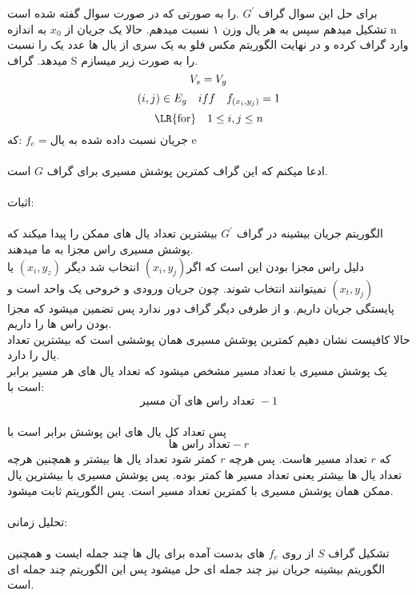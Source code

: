 \problem{}
برای حل این سوال گراف $G^{\prime}$
.را به صورتی که در صورت سوال گفته شده است تشکیل میدهم
سپس به هر یال وزن ۱ نسبت میدهم.
حالا یک جریان از $x_0$
به اندازه n
وارد گراف کرده و در نهایت الگوریتم مکس فلو به یک سری از یال ها عدد یک را نسبت
میدهد.
گراف S را به صورت زیر میسازم.\\
\[
    V_s = V_g\\
\]
\[
    (i,j) \in E_g \quad iff \quad f_{(x_i,y_j)} = 1\\
\]
\[
    \text{\LR{for}} \quad  1\leq i,j\leq n
\]
که:  $f_e = \text{جریان نسبت داده شده به یال e}$ \\\\
ادعا میکنم که این گراف کمترین پوشش مسیری برای گراف $G$ است.\\\\
اثبات:\\\\
الگوریتم جریان بیشینه در گراف $G^{\prime}$ 
بیشترین تعداد یال های ممکن را پیدا میکند که پوشش مسیری راس مجزا به ما میدهند.\\
دلیل راس مجزا بودن این است که اگر$(x_i,y_j)$ انتخاب شد
دیگر $(x_i,y_z)$ یا $(x_t,y_j)$ نمیتوانند انتخاب شوند.
چون جریان ورودی و خروحی یک واحد است و پایستگی جریان داریم.
و از طرفی دیگر گراف دور ندارد پس تضمین میشود که مجزا بودن راس ها را داریم.\\
حالا کافیست نشان دهیم
کمترین پوشش مسیری همان پوششی است که بیشترین تعداد یال را دارد.
\\
یک پوشش مسیری با تعداد مسیر مشخص میشود که تعداد یال های هر مسیر
برابر است با:\\
\[\text{تعداد راس های آن مسیر } -1\]
\\
پس تعداد کل یال های این پوشش برابر است با 
\[ \text{تعداد راس ها} - r\]
که $r$ تعداد مسیر هاست.
پس هرچه $r$ کمتر شود تعداد یال ها بیشتر و همچنین
هرچه تعداد یال ها بیشتر یعنی تعداد مسیر ها کمتر بوده.
پس پوشش مسیری با بیشترین یال ممکن همان پوشش مسیری با کمترین تعداد مسیر است.
پس الگوریتم ثابت میشود.
\\\\
تحلیل زمانی:\\\\
تشکیل گراف $S$ از روی $f_e$
های بدست آمده برای یال ها چند جمله ایست و همچنین الگوریتم بیشینه جریان نیز
چند جمله ای حل میشود پس
این الگوریتم چند جمله ای است.